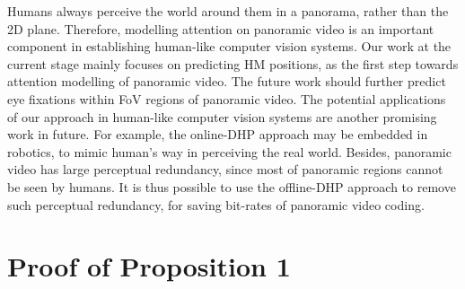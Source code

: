 \documentclass[10pt,journal,compsoc]{IEEEtran}
\begin{document}
Humans always perceive the world around them in a panorama, rather than the 2D plane. Therefore, modelling attention on panoramic video is an important component in establishing human-like computer vision systems. Our work at the current stage mainly focuses on predicting HM positions, as the first step towards attention modelling of panoramic video. The future work should further predict eye fixations within FoV regions of panoramic video. The potential applications of our approach in human-like computer vision systems are another promising work in future. For example, the online-DHP approach may be embedded in robotics, to mimic human's way in perceiving the real world. Besides, panoramic video has large perceptual redundancy, since most of panoramic regions cannot be seen by humans. It is thus possible to use the offline-DHP approach to remove such perceptual redundancy, for saving bit-rates of panoramic video coding.






%


\appendices
\section{Proof of Proposition 1}
\end{document}
